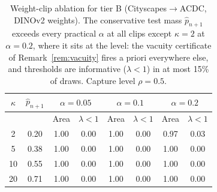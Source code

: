\begin{table}[t]
\centering
\caption{Weight-clip ablation for tier B (Cityscapes$\to$ACDC, DINOv2 weights). The conservative test mass $\hat{p}_{n+1}$ exceeds every practical $\alpha$ at all clips except $\kappa=2$ at $\alpha=0.2$, where it sits at the level: the vacuity certificate of Remark~\ref{rem:vacuity} fires a priori everywhere else, and thresholds are informative ($\lambda<1$) in at most 15\% of draws. Capture level $\rho=0.5$.}
\label{tab:vacuity}
\footnotesize
\setlength{\tabcolsep}{3pt}
\begin{tabular}{cccccccc}
\toprule
$\kappa$ & $\hat{p}_{n+1}$ & \multicolumn{2}{c}{$\alpha=0.05$} & \multicolumn{2}{c}{$\alpha=0.1$} & \multicolumn{2}{c}{$\alpha=0.2$} \\
\midrule
 & & Area & $\lambda{<}1$ & Area & $\lambda{<}1$ & Area & $\lambda{<}1$ \\
\midrule
2 & 0.20 & 1.00 & 0.00 & 1.00 & 0.00 & 0.97 & 0.03 \\
5 & 0.38 & 1.00 & 0.00 & 1.00 & 0.00 & 1.00 & 0.00 \\
10 & 0.55 & 1.00 & 0.00 & 1.00 & 0.00 & 1.00 & 0.00 \\
20 & 0.71 & 1.00 & 0.00 & 1.00 & 0.00 & 1.00 & 0.00 \\
\bottomrule
\end{tabular}
\end{table}
